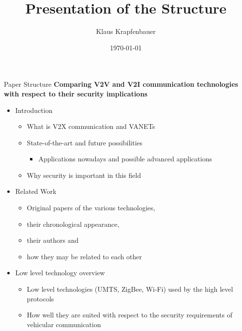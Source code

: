 \documentclass[]{beamer} %
\title{Presentation of the Structure}
\author{Klaus Krapfenbauer}
\date{\today}
\begin{document}
\maketitle


\begin{frame}[allowframebreaks]{Paper Structure}
	\textbf{Comparing V2V and V2I communication technologies with respect to their security implications}

	\begin{itemize}
		\item Introduction
	
			\begin{itemize}
				\item What is V2X communication and VANETs
				\item State-of-the-art and future possibilities
				\begin{itemize}
					\item Applications nowadays and possible advanced applications
				\end{itemize}
				\item Why security is important in this field
			\end{itemize}

		\item Related Work

			\begin{itemize}
				\item Original papers of the various technologies,
				\item their chronological appearance,
				\item their authors and
				\item how they may be related to each other
			\end{itemize}

		\item Low level technology overview

			\begin{itemize}
				\item Low level technologies (UMTS, ZigBee, Wi-Fi) used by the high level protocols
				\item How well they are suited with respect to the security
					requirements of vehicular communication
			\end{itemize}


\end{itemize}
\end{frame}
\end{document}
